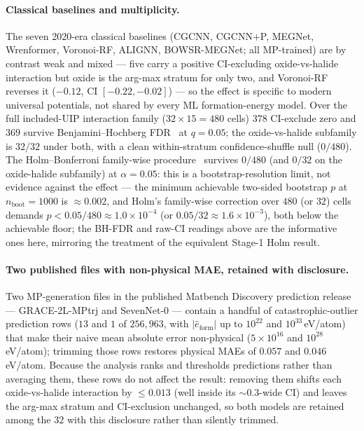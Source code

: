 \documentclass[aip,jcp,preprint,superscriptaddress,amsmath,amssymb]{revtex4-2}
\begin{document}
\paragraph{Classical baselines and multiplicity.} The seven 2020-era classical baselines
(CGCNN, CGCNN+P, MEGNet, Wrenformer, Voronoi-RF, ALIGNN, BOWSR-MEGNet; all MP-trained) are by
contrast weak and mixed --- five carry a positive CI-excluding oxide-vs-halide interaction but
oxide is the arg-max stratum for only two, and Voronoi-RF reverses it ($-0.12$, CI $[-0.22, -0.02]$)
--- so the effect is specific to modern universal potentials, not shared by every ML
formation-energy model. Over the full included-UIP interaction family ($32 \times 15 = 480$
cells) $378$ CI-exclude zero and $369$ survive Benjamini--Hochberg FDR~\citep{benjamini1995fdr}
at $q = 0.05$; the oxide-vs-halide subfamily is $32/32$ under both, with a clean within-stratum
confidence-shuffle null ($0/480$). The Holm--Bonferroni family-wise procedure~\citep{holm1979}
survives $0/480$ (and $0/32$ on the oxide-halide subfamily) at $\alpha = 0.05$: this is a
bootstrap-resolution limit, not evidence against the effect --- the minimum achievable two-sided
bootstrap $p$ at $n_{\mathrm{boot}} = 1000$ is $\approx\!0.002$, and Holm's family-wise correction
over $480$ (or $32$) cells demands $p < 0.05/480 \approx 1.0\times10^{-4}$ (or
$0.05/32 \approx 1.6\times10^{-3}$), both below the achievable floor; the BH-FDR and raw-CI readings above are
the informative ones here, mirroring the treatment of the equivalent Stage-1 Holm result.

\paragraph{Two published files with non-physical MAE, retained with disclosure.} Two MP-generation
files in the published Matbench Discovery prediction release --- GRACE-2L-MPtrj and SevenNet-0 --- contain a handful of
catastrophic-outlier prediction rows ($13$ and $1$ of $256{,}963$, with $|\hat{e}_{\mathrm{form}}|$
up to $10^{22}$ and $10^{33}$\,eV/atom) that make their naive mean absolute error
non-physical ($5\times10^{16}$ and $10^{28}$\,eV/atom); trimming those rows restores physical MAEs
of $0.057$ and $0.046$\,eV/atom. Because the analysis ranks and thresholds predictions rather than
averaging them, these rows do not affect the result: removing them shifts each oxide-vs-halide
interaction by $\le\!0.013$ (well inside its $\sim\!0.3$-wide CI) and leaves the arg-max stratum
and CI-exclusion unchanged, so both models are retained among the $32$ with this disclosure rather
than silently trimmed.
\end{document}
